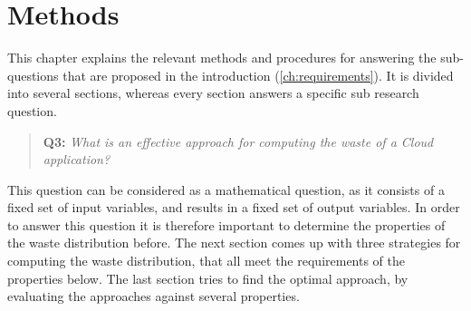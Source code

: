 \chapter{Methods}\label{ch:methods}
This chapter explains the relevant methods and procedures for answering the sub-questions that are proposed in the introduction (\autoref{ch:requirements}). It is divided into several sections, whereas every section answers a specific sub research question.

\begin{quote}
\textbf{Q3: }\textit{What is an effective approach for computing the waste of a Cloud application?}\\
\end{quote}

\noindent
This question can be considered as a mathematical question, as it consists of a fixed set of input variables, and results in a fixed set of output variables. In order to answer this question it is therefore important to determine the properties of the waste distribution before. The next section comes up with three strategies for computing the waste distribution, that all meet the requirements of the properties below. The last section tries to find the optimal approach, by evaluating the approaches against several properties.

